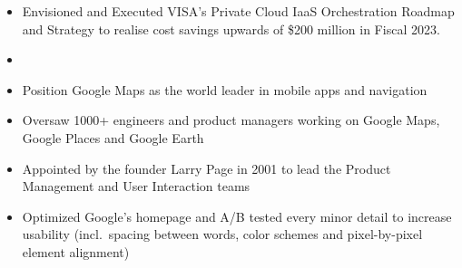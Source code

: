 \documentclass[10pt,a4paper,ragged2e,withhyper]{altacv}
\begin{document}
\begin{paracol}{2}


\begin{itemize}
  \item Envisioned and Executed VISA's Private Cloud IaaS Orchestration Roadmap and Strategy to realise cost savings upwards of \$200 million in Fiscal 2023.
  \item 
\end{itemize}

\divider

\begin{itemize}
\item Position Google Maps as the world leader in mobile apps and navigation
\item Oversaw 1000+ engineers and product managers working on Google Maps, Google Places and Google Earth
\end{itemize}

\divider


\divider


\begin{itemize}
\item Appointed by the founder Larry Page in 2001 to lead the Product Management and User Interaction teams
\item Optimized Google's homepage and A/B tested every minor detail to increase usability (incl.~spacing between words, color schemes and pixel-by-pixel element alignment)
\end{itemize}


\end{paracol}
\end{document}

